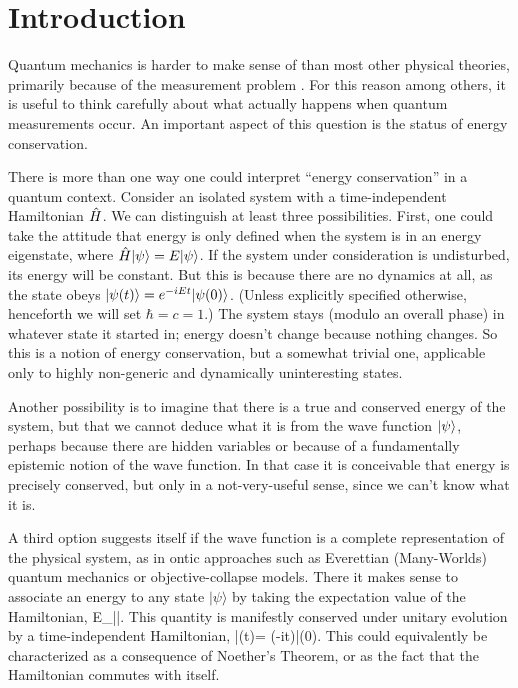 \documentclass[aps,prd,onecolumn,nofootinbib,notitlepage]{revtex4-1}
\begin{document}
\maketitle

\section{Introduction}

Quantum mechanics is harder to make sense of than most other physical theories, primarily because of the measurement problem \cite{Wallace2007-WALTQM}.
For this reason among others, it is useful to think carefully about what actually happens when quantum measurements occur.
An important aspect of this question is the status of energy conservation.

There is more than one way one could interpret ``energy conservation'' in a quantum context.
Consider an isolated system with a time-independent Hamiltonian $\hat{H}$.
We can distinguish at least three possibilities.
First, one could take the attitude that energy is only {defined} when the system is in an energy eigenstate, where $\hat{H}\lvert \psi\rangle = E\lvert \psi\rangle$.
If the system under consideration is undisturbed, its energy will be constant.
But this is because there are no dynamics at all, as the state obeys $\lvert \psi(t)\rangle = e^{-iE t }\lvert \psi(0)\rangle$.
(Unless explicitly specified otherwise, henceforth we will set $\hbar=c=1$.)
The system stays (modulo an overall phase) in whatever state it started in; energy doesn't change because nothing changes.
So this is a notion of energy conservation, but a somewhat trivial one, applicable only to highly non-generic and dynamically uninteresting states.

Another possibility is to imagine that there is a true and conserved energy of the system, but that we cannot deduce what it is from the wave function $\lvert \psi\rangle$, perhaps because there are hidden variables or because of a fundamentally epistemic notion of the wave function.
In that case it is conceivable that energy is precisely conserved, but only in a not-very-useful sense, since we can't know what it is.

A third option suggests itself if the wave function is a complete representation of the physical system, as in ontic approaches such as Everettian (Many-Worlds) quantum mechanics or objective-collapse models.
There it makes sense to associate an energy to any state $|\psi\rangle$ by taking the expectation value of the Hamiltonian,
\be
  E_\psi \equiv \langle \psi|\ham |\psi\rangle.
  \label{energydef}
\ee
This quantity is manifestly conserved under unitary evolution by a time-independent Hamiltonian, 
\be
|\psi(t)\rangle = \exp(-i\ham t)|\psi(0)\rangle.
\ee
This could equivalently be characterized as a consequence of Noether's Theorem, or as the fact that the Hamiltonian commutes with itself.
\end{document}
